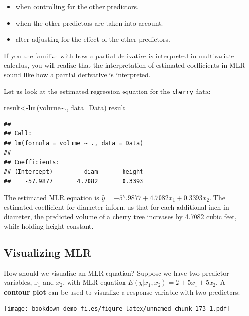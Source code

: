\documentclass[
]{book}
\newenvironment{Shaded}{\begin{snugshade}}{\end{snugshade}}
\newcommand{\AttributeTok}[1]{\textcolor[rgb]{0.13,0.29,0.53}{#1}}
\newcommand{\FunctionTok}[1]{\textcolor[rgb]{0.13,0.29,0.53}{\textbf{#1}}}
\newcommand{\NormalTok}[1]{#1}
\newcommand{\OtherTok}[1]{\textcolor[rgb]{0.56,0.35,0.01}{#1}}
\newcommand{\SpecialCharTok}[1]{\textcolor[rgb]{0.81,0.36,0.00}{\textbf{#1}}}
\providecommand{\tightlist}{%
  \setlength{\itemsep}{0pt}\setlength{\parskip}{0pt}}
\begin{document}
\begin{itemize}
\tightlist
\item
  when controlling for the other predictors.
\item
  when the other predictors are taken into account.
\item
  after adjusting for the effect of the other predictors.
\end{itemize}

If you are familiar with how a partial derivative is interpreted in multivariate calculus, you will realize that the interpretation of estimated coefficients in MLR sound like how a partial derivative is interpreted.

Let us look at the estimated regression equation for the \texttt{cherry} data:

\begin{Shaded}
\begin{Highlighting}[]
\NormalTok{result}\OtherTok{\textless{}{-}}\FunctionTok{lm}\NormalTok{(volume}\SpecialCharTok{\textasciitilde{}}\NormalTok{., }\AttributeTok{data=}\NormalTok{Data)}
\NormalTok{result}
\end{Highlighting}
\end{Shaded}

\begin{verbatim}
## 
## Call:
## lm(formula = volume ~ ., data = Data)
## 
## Coefficients:
## (Intercept)         diam       height  
##    -57.9877       4.7082       0.3393
\end{verbatim}

The estimated MLR equation is \(\hat{y} = -57.9877 + 4.7082x_1 + 0.3393x_2\). The estimated coefficient for diameter inform us that for each additional inch in diameter, the predicted volume of a cherry tree increases by 4.7082 cubic feet, while holding height constant.

\hypertarget{visualizing-mlr}{%
\subsection{Visualizing MLR}\label{visualizing-mlr}}

How should we visualize an MLR equation? Suppose we have two predictor variables, \(x_1\) and \(x_2\), with MLR equation \(E(y|x_1,x_2) = 2 + 5x_1 + 5x_2\). A \textbf{contour plot} can be used to visualize a response variable with two predictors:

\texttt{[image: bookdown-demo\_files/figure-latex/unnamed-chunk-173-1.pdf]}
\end{document}

